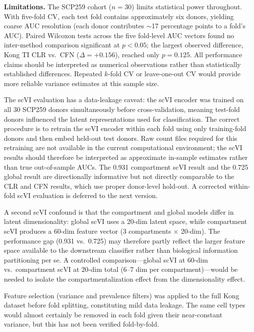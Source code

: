 \documentclass[11pt,letterpaper]{article}
\begin{document}
\textbf{Limitations.}
\label{sec:limitations}
The SCP259 cohort ($n=30$) limits statistical power throughout. With five-fold CV,
each test fold contains approximately six donors, yielding coarse AUC resolution
(each donor contributes $\sim$17 percentage points to a fold's AUC). Paired Wilcoxon
tests across the five fold-level AUC vectors found no inter-method comparison
significant at $p < 0.05$; the largest observed difference, Kong TI CLR vs.\ CFN
($\Delta = +0.156$), reached only $p = 0.125$. All performance claims should be
interpreted as numerical observations rather than statistically established
differences. Repeated $k$-fold CV or leave-one-out CV would provide more
reliable variance estimates at this sample size.

The scVI evaluation has a data-leakage caveat: the scVI encoder was trained on all
30 SCP259 donors simultaneously before cross-validation, meaning test-fold donors
influenced the latent representations used for classification. The correct procedure
is to retrain the scVI encoder within each fold using only training-fold donors and
then embed held-out test donors. Raw count files required for this retraining are
not available in the current computational environment; the scVI results should
therefore be interpreted as approximate in-sample estimates rather than true
out-of-sample AUCs. The 0.931 compartment scVI result and the 0.725 global result
are directionally informative but not directly comparable to the CLR and CFN
results, which use proper donor-level hold-out. A corrected within-fold scVI
evaluation is deferred to the next version.

A second scVI confound is that the compartment and global models differ in latent
dimensionality: global scVI uses a 20-dim latent space, while compartment scVI
produces a 60-dim feature vector (3 compartments $\times$ 20-dim). The
performance gap (0.931 vs.\ 0.725) may therefore partly reflect the larger
feature space available to the downstream classifier rather than biological
information partitioning per se. A controlled comparison—global scVI at 60-dim vs.\ compartment scVI at 20-dim total (6--7 dim per compartment)—would be needed
to isolate the compartmentalization effect from the dimensionality effect.

Feature selection (variance and prevalence filters) was applied to the full Kong
dataset before fold splitting, constituting mild data leakage. The same cell types
would almost certainly be removed in each fold given their near-constant variance,
but this has not been verified fold-by-fold.
\end{document}
